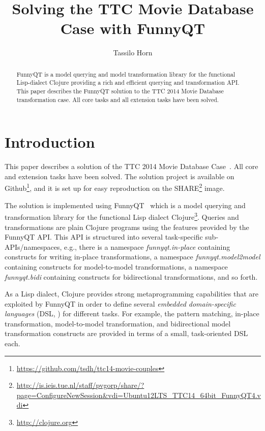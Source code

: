 \documentclass[submission]{eptcs}
\title{Solving the TTC Movie Database Case with FunnyQT}
\author{Tassilo Horn
  \institute{Institute for Software Technology, University Koblenz-Landau, Germany}
  \email{horn@uni-koblenz.de}}
\begin{document}
\maketitle

\begin{abstract}
  FunnyQT is a model querying and model transformation library for the
  functional Lisp-dialect Clojure providing a rich and efficient querying and
  transformation API.  This paper describes the FunnyQT solution to the TTC
  2014 Movie Database transformation case.  All core tasks and all extension
  tasks have been solved.
\end{abstract}


\section{Introduction}
\label{sec:introduction}

This paper describes a solution of the TTC 2014 Movie Database
Case~\cite{movies-case-desc}.  All core and extension tasks have been solved.
The solution project is available on
Github\footnote{\url{https://github.com/tsdh/ttc14-movie-couples}}, and it is
set up for easy reproduction on the
SHARE\footnote{\url{http://is.ieis.tue.nl/staff/pvgorp/share/?page=ConfigureNewSession&vdi=Ubuntu12LTS_TTC14_64bit_FunnyQT4.vdi}}
image.

The solution is implemented using FunnyQT~\cite{Horn2013MQWFQ} which is a model
querying and transformation library for the functional Lisp dialect
Clojure\footnote{\url{http://clojure.org}}.  Queries and transformations are
plain Clojure programs using the features provided by the FunnyQT API.  This
API is structured into several task-specific sub-APIs/namespaces, e.g., there
is a namespace \emph{funnyqt.in-place} containing constructs for writing
in-place transformations, a namespace \emph{funnyqt.model2model} containing
constructs for model-to-model transformations, a namespace \emph{funnyqt.bidi}
containing constructs for bidirectional transformations, and so forth.

As a Lisp dialect, Clojure provides strong metaprogramming capabilities that
are exploited by FunnyQT in order to define several \emph{embedded
  domain-specific languages} (DSL, \cite{book:Fowler2010DSL}) for different
tasks.  For example, the pattern matching, in-place transformation,
model-to-model transformation, and bidirectional model transformation
constructs are provided in terms of a small, task-oriented DSL each.
\end{document}

